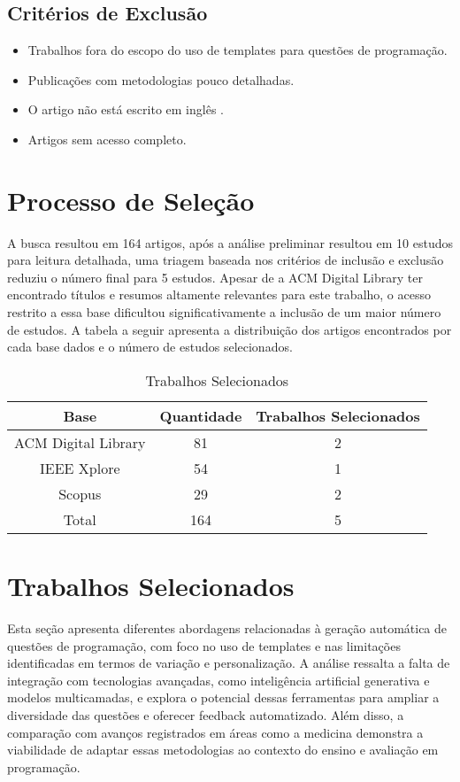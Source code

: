 \subsection{Critérios de Exclusão}
\begin{itemize}
    \item Trabalhos fora do escopo do uso de templates para questões de programação. 
    \item Publicações com metodologias pouco detalhadas. 
    \item O artigo não está escrito em inglês .
    \item Artigos sem acesso completo. 
\end{itemize}

\section{Processo de Seleção}
A busca resultou em 164 artigos, após a análise preliminar resultou em 10 estudos para leitura detalhada, uma triagem baseada nos critérios de inclusão e exclusão reduziu o número final para 5 estudos. Apesar de a ACM Digital Library ter encontrado títulos e resumos altamente relevantes para este trabalho, o acesso restrito a essa base dificultou significativamente a inclusão de um maior número de estudos. A tabela a seguir apresenta a distribuição dos artigos encontrados por cada base dados e o número de estudos selecionados.

\begin{table}[htbp]
    \centering
    \begin{tabular}{|c|c|c|}
        \hline
        Base & Quantidade & Trabalhos Selecionados \\ \hline
        ACM Digital Library & 81 & 2 \\ \hline
        IEEE Xplore & 54 & 1 \\ \hline
        Scopus & 29 & 2 \\ \hline
        Total & 164 & 5 \\ \hline
    \end{tabular}
    \caption{Trabalhos Selecionados}
    \label{tab:table-trabalhos-selecionados}
\end{table}


\section{Trabalhos Selecionados}
Esta seção apresenta diferentes abordagens relacionadas à geração automática de questões de programação, com foco no uso de templates e nas limitações identificadas em termos de variação e personalização. A análise ressalta a falta de integração com tecnologias avançadas, como inteligência artificial generativa e modelos multicamadas, e explora o potencial dessas ferramentas para ampliar a diversidade das questões e oferecer feedback automatizado. Além disso, a comparação com avanços registrados em áreas como a medicina demonstra a viabilidade de adaptar essas metodologias ao contexto do ensino e avaliação em programação. 

